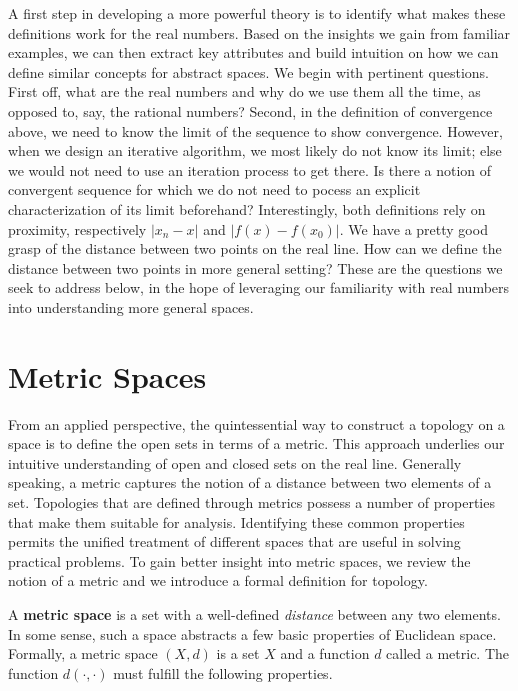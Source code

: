 A first step in developing a more powerful theory is to identify what makes these definitions work for the real numbers.
Based on the insights we gain from familiar examples, we can then extract key attributes and build intuition on how we can define similar concepts for abstract spaces.
We begin with pertinent questions.
First off, what are the real numbers and why do we use them all the time, as opposed to, say, the rational numbers?
Second, in the definition of convergence above, we need to know the limit of the sequence to show convergence.
However, when we design an iterative algorithm, we most likely do not know its limit; else we would not need to use an iteration process to get there.
Is there a notion of convergent sequence for which we do not need to pocess an explicit characterization of its limit beforehand?
Interestingly, both definitions rely on proximity, respectively $|x_n - x|$ and $|f(x) - f(x_0)|$.
We have a pretty good grasp of the distance between two points on the real line.
How can we define the distance between two points in more general setting?
These are the questions we seek to address below, in the hope of leveraging our familiarity with real numbers into understanding more general spaces.


\section{Metric Spaces}

From an applied perspective, the quintessential way to construct a topology on a space is to define the open sets in terms of a metric.
This approach underlies our intuitive understanding of open and closed sets on the real line.
Generally speaking, a metric captures the notion of a distance between two elements of a set.
Topologies that are defined through metrics possess a number of properties that make them suitable for analysis.
Identifying these common properties permits the unified treatment of different spaces that are useful in solving practical problems.
To gain better insight into metric spaces, we review the notion of a metric and we introduce a formal definition for topology.

A \textbf{metric space} is a set with a well-defined \emph{distance} between any two elements.
In some sense, such a space abstracts a few basic properties of Euclidean space.
Formally, a metric space $(X,d)$ is a set $X$ and a function $d$ called a metric.
The function $d(\cdot, \cdot)$ must fulfill the following properties.

